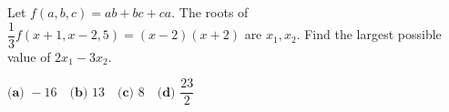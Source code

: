 Let $f(a,b,c)=ab+bc+ca$. The roots of $\dfrac13f(x+1,x-2,5)=(x-2)(x+2)$ are $x_1,x_2$. Find the largest possible value of $2x_1-3x_2$.

$\textbf{(a) }-16\quad\textbf{(b) }13\quad\textbf{(c) }8\quad\textbf{(d) }\dfrac{23}2$
